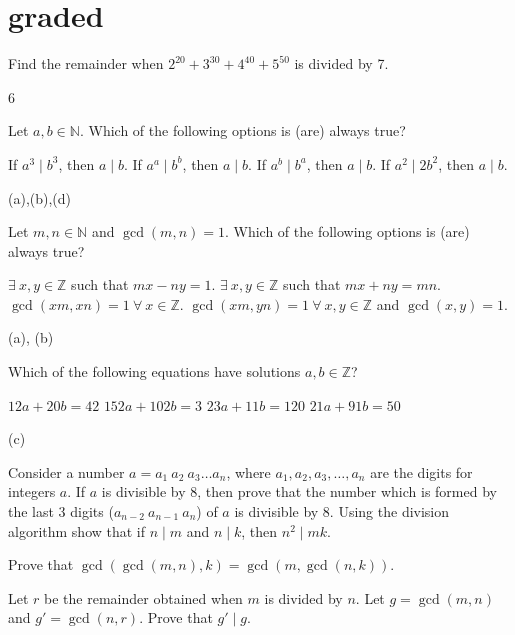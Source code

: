 \documentclass[12pt, answers, a4paper]{exam}
\begin{document}
\section*{graded}

\begin{questions}
\question[2] Find the remainder when $2^{20} + 3^{30} + 4^{40} + 5^{50}$ is divided by 7.
\begin{solution}
    6
\end{solution}
\question[2]  Let $a,b \in \mathbb{N}$. Which of the following options is (are) always true?
\begin{choices}
    \choice If $a^3 \mid b^3$, then $a \mid b$.
    \choice If $a^a \mid b^b$, then $a \mid b$.
    \choice If $a^b \mid b^a$, then $a \mid b$.
    \choice If $a^2 \mid 2b^2$, then $a \mid b$.
\end{choices}
\begin{solution}
    (a),(b),(d)
\end{solution}

\question[1] Let $m,n \in \mathbb{N}$ and $\gcd(m,n) = 1$. Which of the following options is (are) always true?
\begin{choices}
    \choice $\exists\ x, y \in \mathbb{Z}$ such that $mx - ny =1$.
    \choice $\exists\ x, y \in \mathbb{Z}$ such that $mx + ny = mn$.
    \choice $\gcd(xm, xn) = 1 \ \forall\ x \in \mathbb{Z}$. 
    \choice $\gcd(xm, yn) = 1\ \forall\ x,y \in \mathbb{Z}$ and $\gcd(x,y) =1$.
\end{choices}
\begin{solution}
    (a), (b)
\end{solution}

\question[2] Which of the following equations have solutions $a, b \in \mathbb{Z}$?
\begin{choices}

    \choice $12a + 20b = 42$
    \choice $152a + 102b = 3$
    \choice $23a + 11b = 120$
    \choice $21a + 91b = 50$
\end{choices}
\begin{solution}
    (c)
\end{solution}

\question[3] Consider a  number $a=a_1~a_2~a_3\hdots a_n$, where $a_1, a_2, a_3, \hdots , a_n$ are the digits for integers $a$. If $a$ is divisible by $8$, then prove that the number which is formed by the last 3 digits ($a_{n-2}~a_{n-1}~a_n$) of $a$ is divisible by 8.
\question[2] Using the division algorithm show that if $n \mid m$ and $n \mid k$, then $n^2\mid mk$.

\question[4] Prove that $\gcd(\gcd(m, n), k)=\gcd(m, \gcd(n, k))$.




\question[4] Let $r$ be the remainder obtained when $m$ is divided by $n$. Let  $g=\gcd(m, n)$ and $g'=\gcd(n, r)$. Prove that $g'\mid g$. 








\end{questions}
\end{document}
